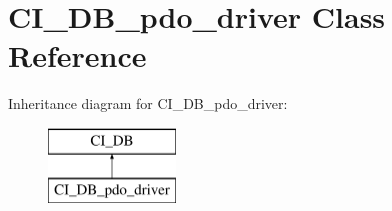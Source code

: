 \hypertarget{class_c_i___d_b__pdo__driver}{\section{C\-I\-\_\-\-D\-B\-\_\-pdo\-\_\-driver Class Reference}
\label{class_c_i___d_b__pdo__driver}
}
Inheritance diagram for C\-I\-\_\-\-D\-B\-\_\-pdo\-\_\-driver\-:\begin{figure}[H]
\begin{center}
\leavevmode
\includegraphics[height=2.000000cm]{class_c_i___d_b__pdo__driver}
\end{center}
\end{figure}
